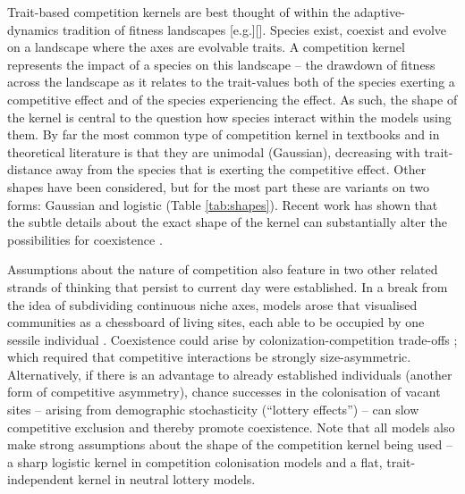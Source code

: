 \documentclass[a4paper,11pt]{article}
\begin{document}
Trait-based competition kernels are best thought of within the
adaptive- dynamics tradition of fitness landscapes [e.g.][]\citep
{Geritz-1999}. Species exist,
coexist and evolve on a landscape where the axes are evolvable
traits. A competition kernel represents the impact of a species on
this landscape --
the drawdown of fitness across the landscape as it
relates to the trait-values both of the species exerting a competitive
effect and of the species experiencing the effect.
As such, the shape of the kernel is central to the question how
species interact within the models using them.
By far the most common type of competition kernel in textbooks and in
theoretical literature is that they are unimodal (Gaussian),
decreasing with trait-distance away from the species that is exerting
the competitive effect. Other shapes have been considered, but for the
most part these are variants on two forms: Gaussian and logistic
(Table \ref{tab:shapes}).
Recent work has shown that the subtle details about the exact shape of the
kernel can substantially alter the possibilities for coexistence
\citep{Calcagno-2006, Scheffer-2006, Pigolotti-2007,
 Barabas-2012,Barabas-2013,DAndrea-2013,Leimar-2013}.

Assumptions about the nature of competition also feature in two other 
related strands of thinking that persist to current day were established. In
a break from the idea of subdividing continuous
niche axes, models arose
that visualised communities as a chessboard of living sites, each able to be
occupied by one sessile individual \citep{Yodzis-1978}. Coexistence could
arise by colonization-competition trade-offs \citep{Levins-1971,
Geritz-1999, Calcagno-2006}; which required that competitive interactions
be strongly size-asymmetric. Alternatively, if there is an advantage to
already established individuals (another form of competitive asymmetry),
chance successes in the colonisation of vacant sites  -- arising from 
demographic stochasticity
(``lottery effects'') \citep {Sale-1977, Hubbell-2001} -- can slow
competitive exclusion and thereby promote coexistence. 
%
Note that all models also make strong assumptions about the shape of
the competition kernel being used -- a sharp
logistic kernel in competition colonisation models and a
flat, trait-independent kernel in neutral lottery models.
\end{document}
